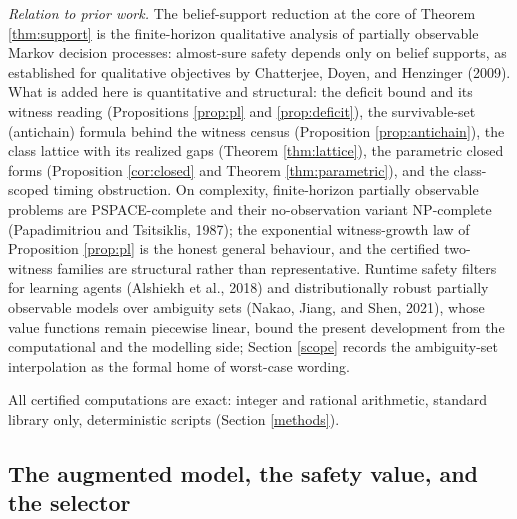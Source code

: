 \documentclass[10pt,twocolumn]{article}
\theoremstyle{plain}
\theoremstyle{definition}
\theoremstyle{remark}
\begin{document}
\emph{Relation to prior work.} The belief-support reduction at the core
of Theorem \ref{thm:support} is the finite-horizon qualitative analysis
of partially observable Markov decision processes: almost-sure safety
depends only on belief supports, as established for qualitative
objectives by Chatterjee, Doyen, and Henzinger (2009). What is added
here is quantitative and structural: the deficit bound and its witness
reading (Propositions \ref{prop:pl} and \ref{prop:deficit}), the
survivable-set (antichain) formula behind the witness census
(Proposition \ref{prop:antichain}), the class lattice with its realized
gaps (Theorem \ref{thm:lattice}), the parametric closed forms
(Proposition \ref{cor:closed} and Theorem \ref{thm:parametric}), and the
class-scoped timing obstruction. On complexity, finite-horizon partially
observable problems are PSPACE-complete and their no-observation variant
NP-complete (Papadimitriou and Tsitsiklis, 1987); the exponential
witness-growth law of Proposition \ref{prop:pl} is the honest general
behaviour, and the certified two-witness families are structural rather
than representative. Runtime safety filters for learning agents
(Alshiekh et al., 2018) and distributionally robust partially observable
models over ambiguity sets (Nakao, Jiang, and Shen, 2021), whose value
functions remain piecewise linear, bound the present development from
the computational and the modelling side; Section \ref{scope} records
the ambiguity-set interpolation as the formal home of worst-case
wording.

All certified computations are exact: integer and rational arithmetic,
standard library only, deterministic scripts (Section \ref{methods}).

\subsection{The augmented model, the safety value, and the selector}\label{model}
\end{document}
